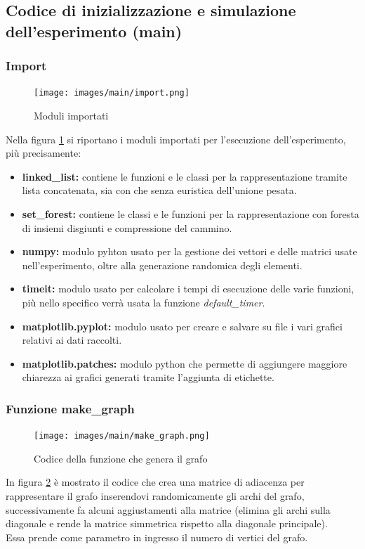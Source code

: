 \documentclass[12pt]{article}
\begin{document}
\subsection{Codice di inizializzazione e simulazione dell'esperimento (main)}

\subsubsection{Import}
\begin{figure}[h]
    \centering
    \texttt{[image: images/main/import.png]}
    \caption{Moduli importati}
    \label{fig:import}
\end{figure}
Nella figura \ref{fig:import} si riportano i moduli importati per l'esecuzione dell'esperimento, più precisamente:
\begin{itemize}
    \item \textbf{linked\_list:} contiene le funzioni e le classi per la rappresentazione tramite lista concatenata, sia con che senza euristica dell'unione pesata.
    \item \textbf{set\_forest:} contiene le classi e le funzioni per la rappresentazione con foresta di insiemi disgiunti e compressione del cammino.
    \item \textbf{numpy:} modulo pyhton usato per la gestione dei vettori e delle matrici usate nell'esperimento, oltre alla generazione randomica degli elementi.
    \item \textbf{timeit:} modulo usato per calcolare i tempi di esecuzione delle varie funzioni, più nello specifico verrà usata la funzione \textit{default\_timer}.
    \item \textbf{matplotlib.pyplot:} modulo usato per creare e salvare su file i vari grafici relativi ai dati raccolti.
    \item \textbf{matplotlib.patches:} modulo python che permette di aggiungere maggiore chiarezza ai grafici generati tramite l'aggiunta di etichette.
\end{itemize}

\subsubsection{Funzione make\_graph}
\begin{figure}[h]
    \centering
    \texttt{[image: images/main/make\_graph.png]}
    \caption{Codice della funzione che genera il grafo}
    \label{fig:make_graph}
\end{figure}
In figura \ref{fig:make_graph} è mostrato il codice che crea una matrice di adiacenza per rappresentare il grafo inserendovi randomicamente gli archi del grafo, successivamente fa alcuni aggiustamenti alla matrice (elimina gli archi sulla diagonale e rende la matrice simmetrica rispetto alla diagonale principale).\\
Essa prende come parametro in ingresso il numero di vertici del grafo.
\end{document}
